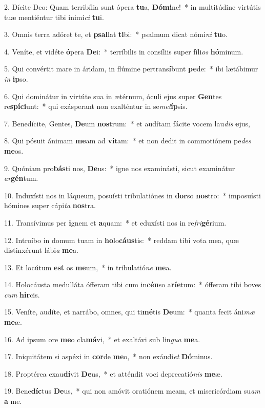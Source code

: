 2. Dícite Deo: Quam terribília sunt ópera \textbf{tu}a, \textbf{Dó}\textbf{mi}ne!~*  in multitúdine virtútis tuæ mentiéntur tibi inimí\textit{ci} \textbf{tu}i.\

3. Omnis terra adóret te, et \textbf{psal}lat \textbf{ti}bi:~*  psalmum dicat nómi\textit{ni} \textbf{tu}o.\

4. Veníte, et vidéte \textbf{ó}pera \textbf{De}i:~*  terríbilis in consíliis super fíli\textit{os} \textbf{hó}minum.\

5. Qui convértit mare in áridam, in flúmine pertrans\textbf{í}bunt \textbf{pe}de:~*  ibi lætábimur \textit{in} \textbf{ip}so.\

6. Qui dominátur in virtúte sua in ætérnum, óculi ejus super \textbf{Gen}tes re\textbf{spí}\textbf{ci}unt:~*  qui exásperant non exalténtur in se\textit{met}\textbf{íp}sis.\

7. Benedícite, Gentes, \textbf{De}um \textbf{nos}trum:~*  et audítam fácite vocem lau\textit{dis} \textbf{e}jus,\

8. Qui pósuit ánimam \textbf{me}am ad \textbf{vi}tam:~*  et non dedit in commotiónem pe\textit{des} \textbf{me}os.\

9. Quóniam pro\textbf{bás}ti nos, \textbf{De}us:~*  igne nos examinásti, sicut examinátur \textit{ar}\textbf{gén}tum.\

10. Induxísti nos in láqueum, posuísti tribulatiónes in \textbf{dor}so \textbf{nos}tro:~*  imposuísti hómines super cápi\textit{ta} \textbf{nos}tra.\

11. Transívimus per \textbf{i}gnem et \textbf{a}quam:~*  et eduxísti nos in re\textit{fri}\textbf{gé}rium.\

12. Introíbo in domum tuam in \textbf{ho}lo\textbf{cáus}tis:~*  reddam tibi vota mea, quæ distinxérunt lábi\textit{a} \textbf{me}a.\

13. Et locútum \textbf{est} os \textbf{me}um,~*  in tribulatió\textit{ne} \textbf{me}a.\

14. Holocáusta medulláta ófferam tibi cum in\textbf{cén}so a\textbf{rí}\textbf{e}tum:~*  ófferam tibi boves \textit{cum} \textbf{hir}cis.\

15. Veníte, audíte, et narrábo, omnes, qui ti\textbf{mé}tis \textbf{De}um:~*  quanta fecit áni\textit{mæ} \textbf{me}æ.\

16. Ad ipsum ore \textbf{me}o cla\textbf{má}vi,~*  et exaltávi sub lin\textit{gua} \textbf{me}a.\

17. Iniquitátem si aspéxi in \textbf{cor}de \textbf{me}o,~*  non exáudi\textit{et} \textbf{Dó}minus.\

18. Proptérea exau\textbf{dí}vit \textbf{De}us,~*  et atténdit voci deprecatió\textit{nis} \textbf{me}æ.\

19. Bene\textbf{díc}tus \textbf{De}us,~*  qui non amóvit oratiónem meam, et misericórdiam su\textit{am} \textbf{a} me.\

